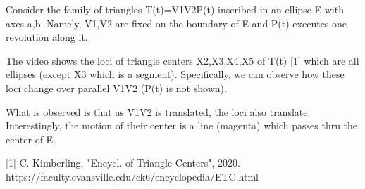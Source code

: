 Consider the family of triangles T(t)=V1V2P(t) inscribed in an ellipse E with axes a,b. Namely, V1,V2 are fixed on the boundary of E and P(t) executes one revolution along it.

The video shows the loci of triangle centers X2,X3,X4,X5 of T(t) [1] which are all ellipses (except X3 which is a segment). Specifically, we can observe how these loci change over parallel V1V2 (P(t) is not shown).

What is observed is that as V1V2 is translated, the loci also translate. Interestingly, the motion of their center is a line (magenta) which passes thru the center of E.

[1] C. Kimberling, "Encycl. of Triangle Centers", 2020. https://faculty.evansville.edu/ck6/encyclopedia/ETC.html